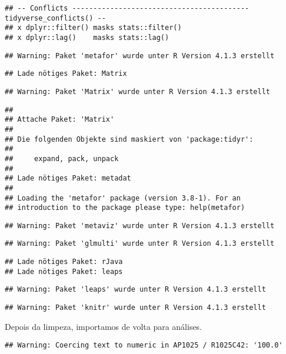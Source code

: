 \documentclass[
]{article}
\begin{document}
\begin{verbatim}
## -- Conflicts ------------------------------------------ tidyverse_conflicts() --
## x dplyr::filter() masks stats::filter()
## x dplyr::lag()    masks stats::lag()
\end{verbatim}

\begin{verbatim}
## Warning: Paket 'metafor' wurde unter R Version 4.1.3 erstellt
\end{verbatim}

\begin{verbatim}
## Lade nötiges Paket: Matrix
\end{verbatim}

\begin{verbatim}
## Warning: Paket 'Matrix' wurde unter R Version 4.1.3 erstellt
\end{verbatim}

\begin{verbatim}
## 
## Attache Paket: 'Matrix'
## 
## Die folgenden Objekte sind maskiert von 'package:tidyr':
## 
##     expand, pack, unpack
## 
## Lade nötiges Paket: metadat
## 
## Loading the 'metafor' package (version 3.8-1). For an
## introduction to the package please type: help(metafor)
\end{verbatim}

\begin{verbatim}
## Warning: Paket 'metaviz' wurde unter R Version 4.1.3 erstellt
\end{verbatim}

\begin{verbatim}
## Warning: Paket 'glmulti' wurde unter R Version 4.1.3 erstellt
\end{verbatim}

\begin{verbatim}
## Lade nötiges Paket: rJava
## Lade nötiges Paket: leaps
\end{verbatim}

\begin{verbatim}
## Warning: Paket 'leaps' wurde unter R Version 4.1.3 erstellt
\end{verbatim}

\begin{verbatim}
## Warning: Paket 'knitr' wurde unter R Version 4.1.3 erstellt
\end{verbatim}

Depois da limpeza, importamos de volta para análises.

\begin{verbatim}
## Warning: Coercing text to numeric in AP1025 / R1025C42: '100.0'
\end{verbatim}
\end{document}
